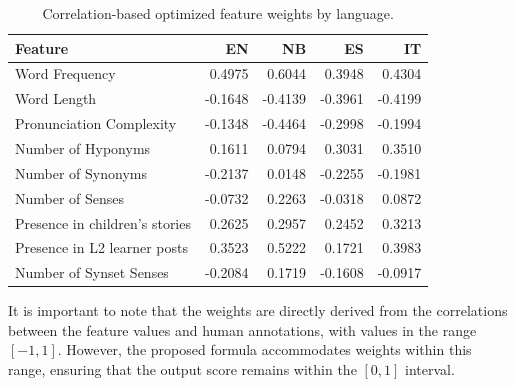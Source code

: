 \documentclass[preprint,12pt,authoryear]{elsarticle}
\begin{document}
\begin{table}[ht]
\centering
\caption{Correlation-based optimized feature weights by language.}
\label{tab:feature_weights}
\begin{tabular}{@{}l r r r r@{}}
\toprule
\textbf{Feature} & \textbf{EN} & \textbf{NB} & \textbf{ES} & \textbf{IT} \\
\midrule
Word Frequency                 & \cellcolor{green!75} 0.4975  & \cellcolor{green!85} 0.6044  & \cellcolor{green!60} 0.3948  & \cellcolor{green!65} 0.4304 \\
Word Length                    & \cellcolor{red!20} -0.1648  & \cellcolor{red!50} -0.4139  & \cellcolor{red!47} -0.3961  & \cellcolor{red!52} -0.4199 \\
Pronunciation Complexity       & \cellcolor{red!17} -0.1348  & \cellcolor{red!56} -0.4464  & \cellcolor{red!37} -0.2998  & \cellcolor{red!25} -0.1994 \\
\midrule
Number of Hyponyms             & \cellcolor{green!50} 0.1611  & \cellcolor{green!40} 0.0794  & \cellcolor{green!65} 0.3031  & \cellcolor{green!70} 0.3510 \\
Number of Synonyms             & \cellcolor{red!27} -0.2137  & \cellcolor{green!30} 0.0148  & \cellcolor{red!29} -0.2255  & \cellcolor{red!25} -0.1981 \\
Number of Senses               & \cellcolor{red!10} -0.0732  & \cellcolor{green!55} 0.2263  & \cellcolor{red!5} -0.0318  & \cellcolor{green!45} 0.0872 \\
\midrule
Presence in children's stories & \cellcolor{green!60} 0.2625  & \cellcolor{green!65} 0.2957  & \cellcolor{green!55} 0.2452  & \cellcolor{green!70} 0.3213 \\
Presence in L2 learner posts   & \cellcolor{green!70} 0.3523  & \cellcolor{green!82} 0.5222  & \cellcolor{green!48} 0.1721  & \cellcolor{green!72} 0.3983 \\
\midrule
Number of Synset Senses        & \cellcolor{red!26} -0.2084  & \cellcolor{green!50} 0.1719  & \cellcolor{red!20} -0.1608  & \cellcolor{red!10} -0.0917 \\
\bottomrule
\end{tabular}
\smallskip
\end{table}




It is important to note that the weights are directly derived from the correlations between the feature values and human annotations, with values in the range $[-1,1]$. However, the proposed formula accommodates weights within this range, ensuring that the output score remains within the $[0,1]$ interval.
\end{document}
